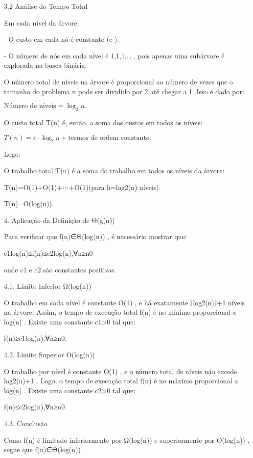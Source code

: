 3.2 Análise do Tempo Total

Em cada nível da árvore:

- O custo em cada nó é constante (c
).

- O número de nós em cada nível é 1,1,1,…
, pois apenas uma subárvore é explorada na busca binária.



O número total de níveis na árvore é proporcional ao número de vezes que o tamanho do problema n
 pode ser dividido por 2 até chegar a 1. Isso é dado por:

\( \text{Número de níveis} = \log_2 n. \)



O custo total T(n)
 é, então, a soma dos custos em todos os níveis:

\( T(n) = c \cdot \log_2 n + \text{termos de ordem constante}. \)

Logo:

O trabalho total T(n)
 é a soma do trabalho em todos os níveis da árvore:

T(n)=O(1)+O(1)+⋯+O(1)(para h=log2(n) níveis).

T(n)=O(log(n)).




4. Aplicação da Definição de Θ(g(n))



Para verificar que f(n)∈Θ(log(n))
, é necessário mostrar que:

c1log(n)≤f(n)≤c2log(n),∀n≥n0


onde c1
 e c2
 são constantes positivas.



4.1. Limite Inferior Ω(log(n))

O trabalho em cada nível é constante O(1)
, e há exatamente ⌊log2(n)⌋+1
 níveis na árvore. Assim, o tempo de execução total f(n)
 é no mínimo proporcional a log(n)
. Existe uma constante c1>0
 tal que:

f(n)≥c1log(n),∀n≥n0.



4.2. Limite Superior O(log(n))

O trabalho por nível é constante O(1)
, e o número total de níveis não excede log2(n)+1
. Logo, o tempo de execução total f(n)
 é no máximo proporcional a log(n)
. Existe uma constante c2>0
 tal que:

f(n)≤c2log(n),∀n≥n0.



4.3. Conclusão

Como f(n)
 é limitado inferiormente por Ω(log(n))
 e superiormente por O(log(n))
 , segue que f(n)∈Θ(log(n))
.